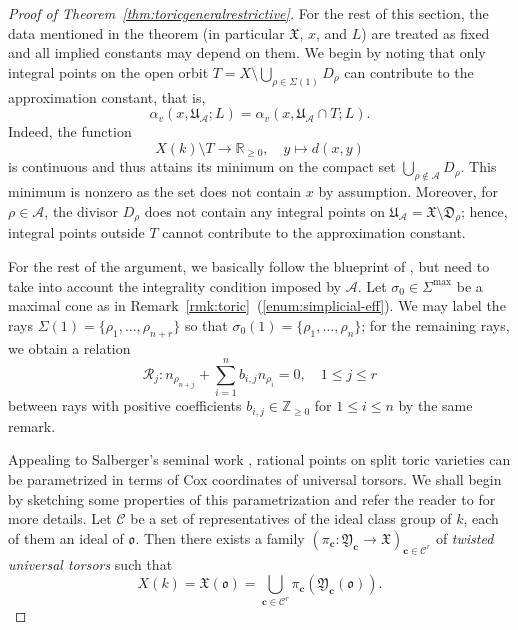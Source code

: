 \documentclass[a4paper, twoside, 11pt]{amsart}
\theoremstyle{definition}
\newcommand{\CR}{{\mathcal{R}}}
\newcommand{\cA}{\mathcal{A}}
\newcommand{\cC}{\mathcal{C}}
\newcommand{\bc}{\boldsymbol{c}}
\newcommand{\mD}{\mathfrak{D}}
\newcommand{\mU}{\mathfrak{U}}
\newcommand{\mX}{\mathfrak{X}}
\newcommand{\mY}{\mathfrak{Y}}
\newcommand{\fo}{\mathfrak{o}}
\newcommand{\RR}{\mathbb{R}}
\newcommand{\ZZ}{\mathbb{Z}}
\begin{document}
\begin{proof}[Proof of Theorem~\ref{thm:toricgeneralrestrictive}]
	For the rest of this section, the data mentioned in the theorem (in particular $\mX$, $x$, and $L$) are treated as fixed and all implied constants may depend on them.
	We begin by noting that only integral points on the open orbit $T = X\setminus \bigcup_{\rho\in \Sigma(1)}D_\rho$ can contribute to the approximation constant, that is,
	\begin{equation*}
        \alpha_v(x,\mU_{\cA};L) = \alpha_v(x,\mU_{\cA}\cap T;L).
    \end{equation*}
	Indeed, the function
	\begin{equation*}
		X(k)\setminus T \to \RR_{\geq 0},\quad y\mapsto d(x,y)
	\end{equation*}
	is continuous and thus attains its minimum on the compact set $\bigcup_{\rho \not \in \cA} D_\rho$. This minimum is nonzero as the set does not contain $x$ by assumption.
	Moreover, for $\rho\in \cA$, the divisor $D_\rho$ does not contain any integral points on $\mU_\cA = \mX \setminus \mD_\rho$; hence, integral points outside $T$  cannot contribute to the approximation constant.


	For the rest of the argument, we basically follow the blueprint of \cite[\S\,6]{HuangANT}, but need to take into account the integrality condition imposed by $\cA$.
	Let $\sigma_0\in\Sigma^{\max}$ be a maximal cone as in Remark~\ref{rmk:toric}~(\ref{enum:simplicial-eff}). We may label the rays $\Sigma(1) = \{\rho_1,\dots,\rho_{n+r}\}$ so that $\sigma_0(1)=\{\rho_1,\dots,\rho_n\}$; for the remaining rays, we obtain a relation
	\begin{equation}\label{eq:relationR}
	\CR_{j}\colon n_{\rho_{n+j}}+\sum_{i=1}^{n} b_{i,j}n_{\rho_i}=0,\quad 1\leq j\leq r
	\end{equation}
	between rays with positive coefficients $b_{i,j}\in\ZZ_{\geq 0}$ for $1\leq i\leq n$ by the same remark. 
	

	Appealing to Salberger's seminal work \cite{Salberger}, rational points on split toric varieties can be parametrized in terms of Cox coordinates of universal torsors. We shall begin by sketching some properties of this parametrization and refer the reader to \cite[\S\,3, \S\,6B]{HuangANT} for more details. Let $\cC$ be a set of representatives of the ideal class group of $k$, each of them an ideal of $\fo$.
	Then there exists a family $(\pi_{\bc}:\mY_{\bc}\to \mX)_{\bc\in \cC^r}$ of \emph{twisted universal torsors} such that
	\begin{equation*}
		X(k)=\mX(\fo)=\bigcup_{\bc\in\cC^r}\pi_{\bc}(\mY_{\bc}(\fo)).
	\end{equation*}


\end{proof}
\end{document}

